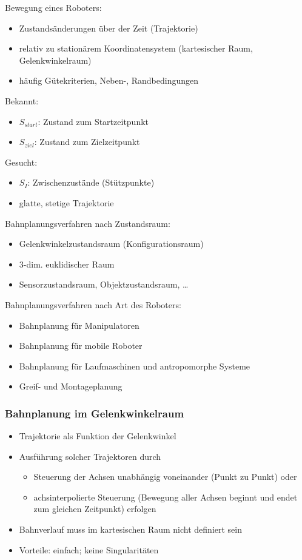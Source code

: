 Bewegung eines Roboters:
\begin{itemize}
\item Zustandsänderungen über der Zeit (Trajektorie)
\item relativ zu stationärem Koordinatensystem (kartesischer Raum, Gelenkwinkelraum)
\item häufig Gütekriterien, Neben-, Randbedingungen
\end{itemize}
Bekannt:
\begin{itemize}
\item $S_{start}$: Zustand zum Startzeitpunkt
\item $S_{ziel}$: Zustand zum Zielzeitpunkt
\end{itemize}
Gesucht:
\begin{itemize}
\item $S_I$: Zwischenzustände (Stützpunkte)
\item glatte, stetige Trajektorie
\end{itemize}
Bahnplanungsverfahren nach Zustandsraum:
\begin{itemize}
\item Gelenkwinkelzustandsraum (Konfigurationsraum)
\item 3-dim. euklidischer Raum
\item Sensorzustandsraum, Objektzustandsraum, \dots
\end{itemize}
Bahnplanungsverfahren nach Art des Roboters:
\begin{itemize}
\item Bahnplanung für Manipulatoren
\item Bahnplanung für mobile Roboter
\item Bahnplanung für Laufmaschinen und antropomorphe Systeme
\item Greif- und Montageplanung
\end{itemize}

\subsubsection*{Bahnplanung im Gelenkwinkelraum}

\begin{itemize}
\item Trajektorie als Funktion der Gelenkwinkel
\item Ausführung solcher Trajektoren durch
\begin{itemize}
\item Steuerung der Achsen unabhängig voneinander (Punkt zu Punkt) oder
\item achsinterpolierte Steuerung (Bewegung aller Achsen beginnt und endet zum gleichen Zeitpunkt) erfolgen
\end{itemize}
\item Bahnverlauf muss im kartesischen Raum nicht definiert sein
\item Vorteile: einfach; keine Singularitäten
\end{itemize}

